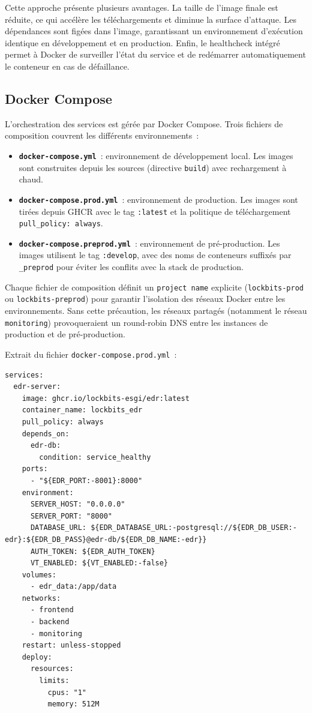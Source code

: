 Cette approche présente plusieurs avantages. La taille de l'image finale est
réduite, ce qui accélère les téléchargements et diminue la surface d'attaque.
Les dépendances sont figées dans l'image, garantissant un environnement
d'exécution identique en développement et en production. Enfin, le healthcheck
intégré permet à Docker de surveiller l'état du service et de redémarrer
automatiquement le conteneur en cas de défaillance.

\subsection{Docker Compose}

L'orchestration des services est gérée par Docker Compose. Trois fichiers de
composition couvrent les différents environnements~:

\begin{itemize}
  \item \textbf{\texttt{docker-compose.yml}}~: environnement de développement
    local. Les images sont construites depuis les sources (directive
    \texttt{build}) avec rechargement à chaud.
  \item \textbf{\texttt{docker-compose.prod.yml}}~: environnement de
    production. Les images sont tirées depuis GHCR avec le tag \texttt{:latest}
    et la politique de téléchargement \texttt{pull\_policy: always}.
  \item \textbf{\texttt{docker-compose.preprod.yml}}~: environnement de
    pré-production. Les images utilisent le tag \texttt{:develop}, avec des
    noms de conteneurs suffixés par \texttt{\_preprod} pour éviter les conflits
    avec la stack de production.
\end{itemize}

Chaque fichier de composition définit un \texttt{project name} explicite
(\texttt{lockbits-prod} ou \texttt{lockbits-preprod}) pour garantir l'isolation
des réseaux Docker entre les environnements. Sans cette précaution, les
réseaux partagés (notamment le réseau \texttt{monitoring}) provoqueraient un
round-robin DNS entre les instances de production et de pré-production.

Extrait du fichier \texttt{docker-compose.prod.yml}~:

\begin{lstlisting}[language=dockercompose, caption={Extrait du docker-compose.prod.yml -- service EDR}, label={lst:docker-compose-prod}]
services:
  edr-server:
    image: ghcr.io/lockbits-esgi/edr:latest
    container_name: lockbits_edr
    pull_policy: always
    depends_on:
      edr-db:
        condition: service_healthy
    ports:
      - "${EDR_PORT:-8001}:8000"
    environment:
      SERVER_HOST: "0.0.0.0"
      SERVER_PORT: "8000"
      DATABASE_URL: ${EDR_DATABASE_URL:-postgresql://${EDR_DB_USER:-edr}:${EDR_DB_PASS}@edr-db/${EDR_DB_NAME:-edr}}
      AUTH_TOKEN: ${EDR_AUTH_TOKEN}
      VT_ENABLED: ${VT_ENABLED:-false}
    volumes:
      - edr_data:/app/data
    networks:
      - frontend
      - backend
      - monitoring
    restart: unless-stopped
    deploy:
      resources:
        limits:
          cpus: "1"
          memory: 512M
\end{lstlisting}

